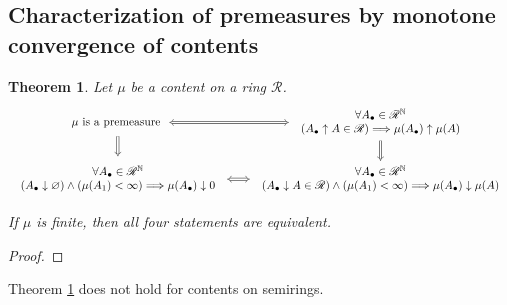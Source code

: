 \documentclass[11pt, a4paper, openany]{book}
\newtheorem{thm}{Theorem}\newtheorem{lem}{Lemma}\newtheorem{crl}{Corollary}
\theoremstyle{definition}
\begin{document}
\subsection{Characterization of premeasures by monotone convergence of contents}
    \begin{thm}
    \label{characterization of premeasures by monotone convergence}
        Let $\mu$ be a content on a ring $\mathscr{R}$.
        \[
            \begin{tikzcd}[column sep={20pt}]
                \text{$\mu$ is a premeasure } \ar[r, Leftrightarrow] \ar[d, Rightarrow, shorten <= 0.13cm, shorten >= 0.14cm] & \begin{tabular}{c}
                    $\forall A_\bullet\in\mathscr{R}^\mathbb{N}$   \\
                    $(A_\bullet\uparrow A\in\mathscr{R})\Longrightarrow \mu(A_\bullet)\uparrow\mu(A)$
                \end{tabular}
                \ar[d, Rightarrow]\\
                \begin{tabular}{c}
                      $\forall A_\bullet\in\mathscr{R}^\mathbb{N}$ \\
                      $(A_\bullet\downarrow \varnothing)\wedge(\mu(A_1)<\infty)\Longrightarrow \mu(A_\bullet)\downarrow 0$
                \end{tabular} \ar[r, Leftrightarrow]  & \begin{tabular}{c}
                      $\forall A_\bullet\in\mathscr{R}^\mathbb{N}$ \\
                      $(A_\bullet\downarrow A\in\mathscr{R})\wedge(\mu(A_1)<\infty)\Longrightarrow \mu(A_\bullet)\downarrow\mu(A)$
                \end{tabular}
            \end{tikzcd}
        \]
        
        If $\mu$ is finite, then all four statements are equivalent.
    \end{thm}
    \begin{proof}
        
    \end{proof}
    Theorem \ref{characterization of premeasures by monotone convergence} does not hold for contents on semirings.
\end{document}
